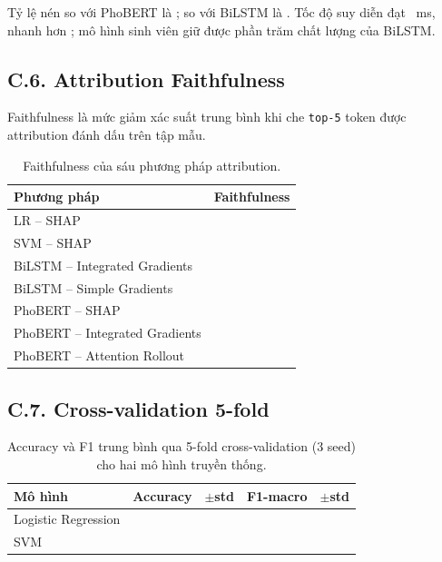 \noindent Tỷ lệ nén so với PhoBERT là \studentcompressionphi{$\times$}; so với BiLSTM là \studentcompressionbI{$\times$}. Tốc độ suy diễn đạt \studentlat{}~ms, nhanh hơn \studentspeedup{$\times$}; mô hình sinh viên giữ được \studentretainbI{} phần trăm chất lượng của BiLSTM.

\subsection*{C.6. Attribution Faithfulness}

Faithfulness là mức giảm xác suất trung bình khi che \texttt{top-5} token được attribution đánh dấu trên tập \nattrexamples{} mẫu.

\begin{table}[H]
  \centering
  \small
  \caption[Faithfulness của sáu phương pháp attribution]{Faithfulness của sáu phương pháp attribution.}
  \label{tab:appendix_faithfulness}
  \begin{tabular}{l c}
    \toprule
    \textbf{Phương pháp} & \textbf{Faithfulness} \\
    \midrule
    LR -- SHAP                     & \attrfaithfulnesslR{} \\
    SVM -- SHAP                    & \attrfaithfulnesssVM{} \\
    BiLSTM -- Integrated Gradients & \attrfaithfulnessbilstm{} \\
    BiLSTM -- Simple Gradients     & \attrfaithfulnessbilstmgrad{} \\
    PhoBERT -- SHAP                & \attrfaithfulnessphobERTSHAP{} \\
    PhoBERT -- Integrated Gradients& \attrfaithfulnessphobERTIG{} \\
    PhoBERT -- Attention Rollout   & \attrfaithfulnessphobERTRollout{} \\
    \bottomrule
  \end{tabular}
\end{table}

\subsection*{C.7. Cross-validation 5-fold}

\begin{table}[H]
  \centering
  \small
  \caption[Cross-validation 5-fold]{Accuracy và F1 trung bình qua 5-fold cross-validation (3 seed) cho hai mô hình truyền thống.}
  \label{tab:appendix_cv}
  \begin{tabular}{l c c c c}
    \toprule
    \textbf{Mô hình} & \textbf{Accuracy} & \textbf{$\pm$std} & \textbf{F1-macro} & \textbf{$\pm$std} \\
    \midrule
    Logistic Regression & \cvlRAcc{} & \cvlRAccstd{} & \cvlRFone{} & \cvlRFonestd{} \\
    SVM                 & \cvsVMAcc{} & \cvsVMAccstd{} & \cvsVMFone{} & \cvsVMFonestd{} \\
    \bottomrule
  \end{tabular}
\end{table}

